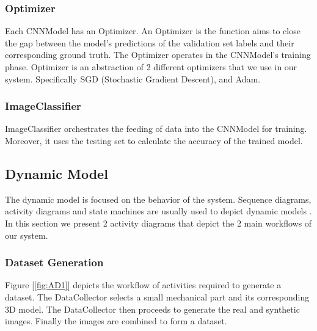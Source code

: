 \documentclass[a4paper,12pt,twoside]{report}
\begin{document}
\subsubsection{Optimizer}
Each CNNModel has an Optimizer. An Optimizer is the function aims to close the gap between the model's predictions of the validation set labels and their corresponding ground truth. The Optimizer operates in the CNNModel's training phase. Optimizer is an abstraction of 2 different optimizers that we use in our system. Specifically SGD (Stochastic Gradient Descent), and Adam.

\subsubsection{ImageClassifier}
ImageClassifier orchestrates the feeding of data into the CNNModel for training. Moreover, it uses the testing set to calculate the accuracy of the trained model.


\subsection{Dynamic Model}

The dynamic model is focused on the behavior of the system. Sequence diagrams, activity diagrams and state machines are usually used to depict dynamic models \cite{bruegge2004object}. In this section we present 2 activity diagrams that depict the 2 main workflows of our system.

\subsubsection{Dataset Generation}

Figure [\ref{fig:AD1}] depicts the workflow of activities required to generate a dataset. The DataCollector selects a small mechanical part and its corresponding 3D model. The DataCollector then proceeds to generate the real and synthetic images. Finally the images are combined to form a dataset.
\end{document}

